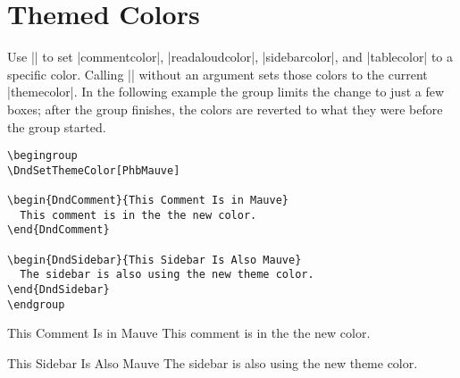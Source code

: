 \documentclass[letterpaper,twocolumn,openany]{dndbook}
\begin{document}
\section{Themed Colors}
Use |\DndSetThemeColor[<color>]| to set |commentcolor|, |readaloudcolor|, |sidebarcolor|, and |tablecolor| to a specific color. Calling |\DndSetThemeColor| without an argument sets those colors to the current |themecolor|. In the following example the group limits the change to just a few boxes; after the group finishes, the colors are reverted to what they were before the group started.

\begin{lstlisting}
\begingroup
\DndSetThemeColor[PhbMauve]

\begin{DndComment}{This Comment Is in Mauve}
  This comment is in the the new color.
\end{DndComment}

\begin{DndSidebar}{This Sidebar Is Also Mauve}
  The sidebar is also using the new theme color.
\end{DndSidebar}
\endgroup
\end{lstlisting}

\begingroup
\DndSetThemeColor[PhbMauve]

\begin{DndComment}{This Comment Is in Mauve}
  This comment is in the the new color.
\end{DndComment}

\begin{DndSidebar}{This Sidebar Is Also Mauve}
  The sidebar is also using the new theme color.
\end{DndSidebar}

\endgroup
\end{document}
